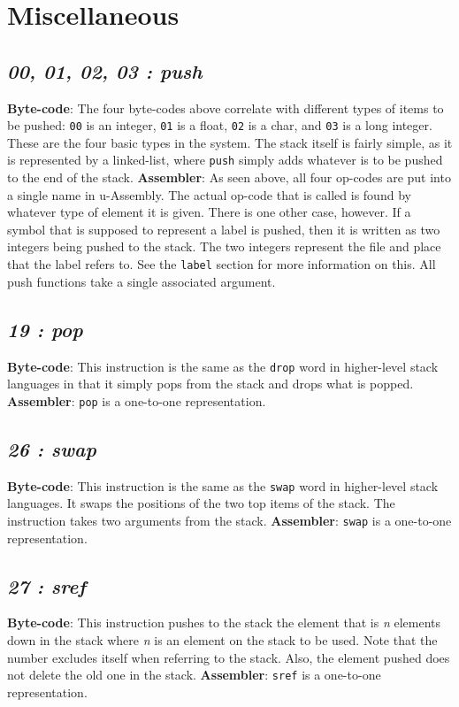 \documentclass[12pt]{report}
\begin{document}
  \section{Miscellaneous}
  \subsection{\emph{00, 01, 02, 03 : push}}
  \textbf{Byte-code}: The four byte-codes above correlate with different types of
  items to be pushed: \verb|00| is an integer, \verb|01| is a float, \verb|02| is a
  char, and \verb|03| is a long integer.  These are the four basic types in the system.
  The stack itself is fairly simple, as it is represented by a linked-list, where
  \verb|push| simply adds whatever is to be pushed to the end of the stack.\newline
  \textbf{Assembler}: As seen above, all four op-codes are put into a single name in
  u-Assembly.  The actual op-code that is called is found by whatever type of
  element it is given.  There is one other case, however.  If a symbol that is
  supposed to represent a label is pushed, then it is written as two integers being
  pushed to the stack.  The two integers represent the file and place that the
  label refers to.  See the \verb|label| section for more information on this.
  \newline
  All push functions take a single associated argument.
  \subsection{\emph{19 : pop}}
  \textbf{Byte-code}: This instruction is the same as the \verb|drop| word in
  higher-level stack languages in that it simply pops from the stack and drops what
  is popped.\newline
  \textbf{Assembler}: \verb|pop| is a one-to-one representation.
  \subsection{\emph{26 : swap}}
  \textbf{Byte-code}: This instruction is the same as the \verb|swap| word in
  higher-level stack languages.  It swaps the positions of the two top items of
  the stack.  The instruction takes two arguments from the stack.
  \textbf{Assembler}: \verb|swap| is a one-to-one representation.
  \subsection{\emph{27 : sref}}
  \textbf{Byte-code}: This instruction pushes to the stack the element that is
  \emph{n} elements down in the stack where \emph{n} is an element on the stack to be
  used.  Note that the number excludes itself when referring to the stack.  Also, the
  element pushed does not delete the old one in the stack.
  \textbf{Assembler}: \verb|sref| is a one-to-one representation.
\end{document}

